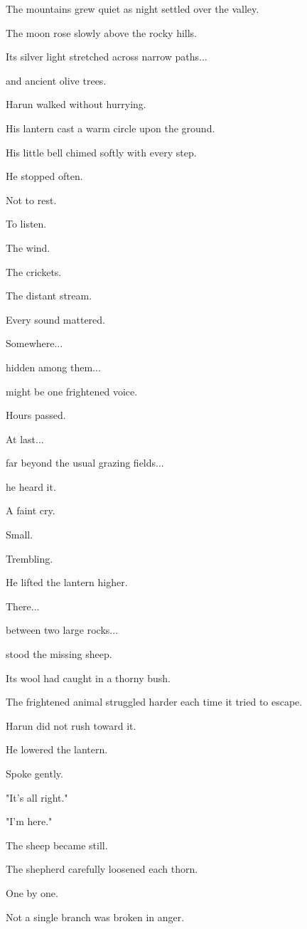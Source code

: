 \documentclass[12pt,openany]{book}
\begin{document}
The mountains grew quiet as night settled over the valley.

The moon rose slowly above the rocky hills.

Its silver light stretched across narrow paths...

and ancient olive trees.

Harun walked without hurrying.

His lantern cast a warm circle upon the ground.

His little bell chimed softly with every step.

He stopped often.

Not to rest.

To listen.

The wind.

The crickets.

The distant stream.

Every sound mattered.

Somewhere...

hidden among them...

might be one frightened voice.

Hours passed.

At last...

far beyond the usual grazing fields...

he heard it.

A faint cry.

Small.

Trembling.

He lifted the lantern higher.

There...

between two large rocks...

stood the missing sheep.

Its wool had caught in a thorny bush.

The frightened animal struggled harder each time it tried to escape.

Harun did not rush toward it.

He lowered the lantern.

Spoke gently.

"It's all right."

"I'm here."

The sheep became still.

The shepherd carefully loosened each thorn.

One by one.

Not a single branch was broken in anger.
\end{document}
